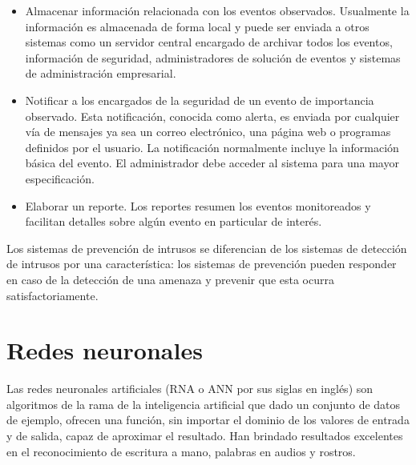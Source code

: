 \begin{itemize}
    \item Almacenar información relacionada con los eventos observados. Usualmente la información es almacenada de forma local y puede ser enviada a otros sistemas como un servidor central encargado de archivar todos los eventos, información de seguridad, administradores de solución de eventos y sistemas de administración empresarial.
    \item Notificar a los encargados de la seguridad de un evento de importancia observado. Esta notificación, conocida como alerta, es enviada por cualquier vía de mensajes ya sea un correo electrónico, una página web o programas definidos por el usuario. La notificación normalmente incluye la información básica del evento. El administrador debe acceder al sistema para una mayor especificación.
    \item Elaborar un reporte. Los reportes resumen los eventos monitoreados y facilitan detalles sobre algún evento en particular de interés.
\end{itemize}

Los sistemas de prevención de intrusos se diferencian de los sistemas de detección de intrusos por una característica: los sistemas de prevención pueden responder en caso de la detección de una amenaza y prevenir que esta ocurra satisfactoriamente.

\section{Redes neuronales}

Las redes neuronales artificiales (RNA o ANN por sus siglas en inglés) son algoritmos de la rama de la inteligencia artificial que dado un conjunto de datos de ejemplo, ofrecen una función, sin importar el dominio de los valores de entrada y de salida, capaz de aproximar el resultado. Han brindado resultados excelentes en el reconocimiento de escritura a mano, palabras en audios y rostros.

